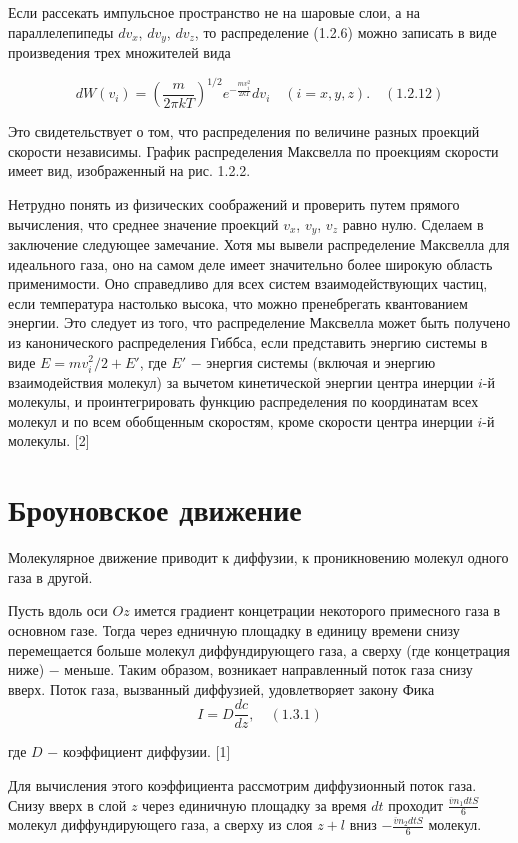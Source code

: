 Если рассекать импульсное пространство не на шаровые слои, а на параллелепипеды $dv_x$, $dv_y$, $dv_z$, то распределение (1.2.6) можно записать в виде произведения трех множителей вида

$$dW(v_i)=\left( \frac{m}{2 \pi kT}\right)^{1/2}e^{-\frac{mv_i^2}{2kT}}dv_i\quad (i=x,y,z). \quad (1.2.12)$$

Это свидетельствует о том, что распределения по величине разных проекций скорости независимы. График распределения Максвелла по проекциям скорости имеет вид, изображенный на рис. 1.2.2.

Нетрудно понять из физических соображений и проверить путем прямого вычисления, что среднее значение проекций $v_x$, $v_y$, $v_z$ равно нулю. Сделаем в заключение следующее замечание. Хотя мы вывели распределение Максвелла для идеального газа, оно на самом деле имеет значительно более широкую область применимости. Оно справедливо для всех систем взаимодействующих частиц, если температура настолько высока, что можно пренебрегать квантованием энергии. Это следует из того, что распределение Максвелла может быть получено из канонического распределения Гиббса, если представить энергию системы в виде $E = mv_i^2/2 + E'$, где $E'$ $-$ энергия системы (включая и энергию взаимодействия молекул) за вычетом кинетической энергии центра инерции $i$-й молекулы, и проинтегрировать функцию распределения по координатам всех молекул и по всем обобщенным скоростям, кроме скорости центра инерции $i$-й молекулы. [2]

\section{Броуновское движение}

Молекулярное движение приводит к диффузии, к проникновению молекул одного газа в другой.

Пусть вдоль оси $Oz$ имется градиент концетрации некоторого примесного газа в основном газе. Тогда через едничную площадку в единицу времени снизу перемещается больше молекул диффундирующего газа, а сверху (где концетрация ниже) $-$ меньше. Таким образом, возникает направленный поток газа снизу вверх. Поток газа, вызванный диффузией, удовлетворяет закону Фика
$$ I = D\frac{dc}{dz}, \quad (1.3.1)$$

где $D$ $-$ коэффициент диффузии. [1]

Для вычисления этого коэффициента рассмотрим диффузионный поток газа. Снизу вверх в слой $z$ через единичную площадку за время $dt$  проходит $\frac{\overline{v}n_1dtS}{6}$ молекул диффундирующего газа, а сверху из слоя $z+l$ вниз $- \frac{\overline{v}n_2dtS}{6}$ молекул.

